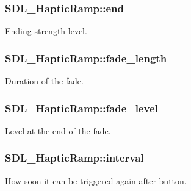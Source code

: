 \subsubsection[{\texorpdfstring{end}{end}}]{ S\+D\+L\+\_\+\+Haptic\+Ramp\+::end}\hypertarget{struct_s_d_l___haptic_ramp_a16dd3ee307795248e21ee45ba8fb4c6c}{}\label{struct_s_d_l___haptic_ramp_a16dd3ee307795248e21ee45ba8fb4c6c}
Ending strength level. 
\subsubsection[{\texorpdfstring{fade\+\_\+length}{fade_length}}]{ S\+D\+L\+\_\+\+Haptic\+Ramp\+::fade\+\_\+length}\hypertarget{struct_s_d_l___haptic_ramp_ad58a8f7cfdf659b45f0503fc56db7436}{}\label{struct_s_d_l___haptic_ramp_ad58a8f7cfdf659b45f0503fc56db7436}
Duration of the fade. 
\subsubsection[{\texorpdfstring{fade\+\_\+level}{fade_level}}]{ S\+D\+L\+\_\+\+Haptic\+Ramp\+::fade\+\_\+level}\hypertarget{struct_s_d_l___haptic_ramp_a66b586f2e6a23a085a7b2854f61752c5}{}\label{struct_s_d_l___haptic_ramp_a66b586f2e6a23a085a7b2854f61752c5}
Level at the end of the fade. 
\subsubsection[{\texorpdfstring{interval}{interval}}]{ S\+D\+L\+\_\+\+Haptic\+Ramp\+::interval}\hypertarget{struct_s_d_l___haptic_ramp_a4b89d108cfa7e96ea58b58771334c33d}{}\label{struct_s_d_l___haptic_ramp_a4b89d108cfa7e96ea58b58771334c33d}
How soon it can be triggered again after button. 
